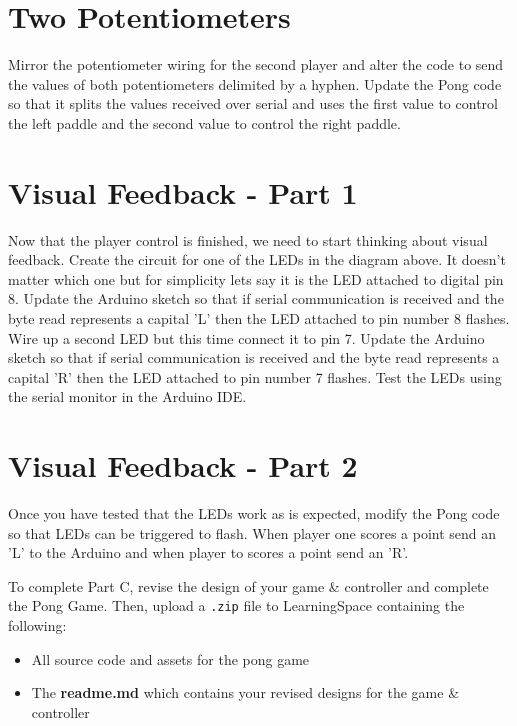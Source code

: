 \documentclass{../../fal_assignment}
\begin{document}
	\section{Two Potentiometers} \label{arduino-second}
	Mirror the potentiometer wiring for the second player and alter the code to send the values of both potentiometers delimited by a hyphen. Update the Pong code so that it splits the values received over serial and uses the first value to control the left paddle and the second value to control the right paddle. 
	
	\section{Visual Feedback - Part 1} \label{arduino-third}
	Now that the player control is finished, we need to start thinking about visual feedback. Create the circuit for one of the LEDs in the diagram above. It doesn't matter which one but for simplicity lets say it is the LED attached to digital pin 8. Update the Arduino sketch so that if serial communication is received and the byte read represents a capital 'L' then the LED attached to pin number 8 flashes. Wire up a second LED but this time connect it to pin 7. Update the Arduino sketch so that if serial communication is received and the byte read represents a capital 'R' then the LED attached to pin number 7 flashes. Test the LEDs using the serial monitor in the Arduino IDE. 
	
	\section{Visual Feedback - Part 2} \label{arduino-fourth}
	Once you have tested that the LEDs work as is expected, modify the Pong code so that LEDs can be triggered to flash. When player one scores a point send an 'L' to the Arduino and when player to scores a point send an 'R'.
	
	

	To complete Part C, revise the design of your game \& controller and complete the Pong Game. Then, upload a \texttt{.zip} file to LearningSpace containing the following:
	
	\begin{itemize}
		\item All source code and assets for the pong game
		\item The \textbf{readme.md} which contains your revised designs for the game \& controller
	\end{itemize}
	
\end{document}
